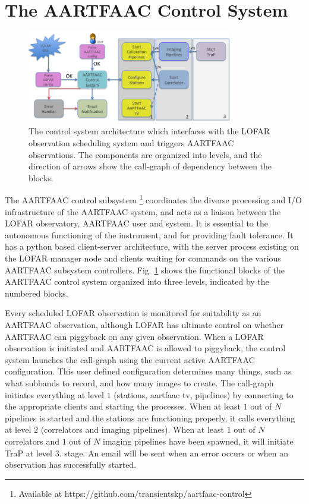 \documentclass{ws-jai}
\begin{document}
\section {\label{sec:acontrol} The AARTFAAC Control System}
\begin{figure}[htbp]
\centering
\includegraphics[width=0.8\textwidth]{Figs/aartfaac_control_system/Slide1.png}
\caption{The  control  system  architecture  which  interfaces  with  the  LOFAR
  observation  scheduling   system  and  triggers  AARTFAAC   observations.  The
  components are  organized into levels,  and the  direction of arrows  show the
  call-graph of dependency between the blocks.}
\label{fig:afaac_ctrl_sys}
\end{figure}
The      AARTFAAC       control      subsystem       \footnote{Available      at
  https://github.com/transientskp/aartfaac-control}   coordinates  the   diverse
processing and I/O infrastructure of the  AARTFAAC system, and acts as a liaison
between the LOFAR observatory, AARTFAAC user and system.  It is essential to the
autonomous functioning of the instrument, and for providing fault tolerance.  It
has a python based client-server  architecture, with the server process existing
on  the LOFAR  manager node  and  clients waiting  for commands  on the  various
AARTFAAC  subsystem  controllers.    Fig.   \ref{fig:afaac_ctrl_sys}  shows  the
functional blocks  of the AARTFAAC  control system organized into  three levels,
indicated by the numbered blocks.

Every scheduled  LOFAR observation is  monitored for suitability as  an AARTFAAC
observation,  although  LOFAR  has  ultimate control  on  whether  AARTFAAC  can
piggyback on any  given observation.  When a LOFAR observation  is initiated and
AARTFAAC is  allowed to  piggyback, the control  system launches  the call-graph
using   the  current   active   AARTFAAC  configuration.    This  user   defined
configuration determines many  things, such as what subbands to  record, and how
many  images  to create.   The  call-graph  initiates  everything at  level  $1$
(stations, aartfaac tv, pipelines) by  connecting to the appropriate clients and
starting the processes.  When  at least $1$ out of $N$  pipelines is started and
the  stations  are  functioning  properly,  it calls  everything  at  level  $2$
(correlators and imaging  pipelines).  When at least $1$ out  of $N$ correlators
and $1$ out of $N$ imaging pipelines have been spawned, it will initiate TraP at
level  $3$.  stage.   An email  will be  sent when  an error  occurs or  when an
observation has successfully started.\\
\end{document}
